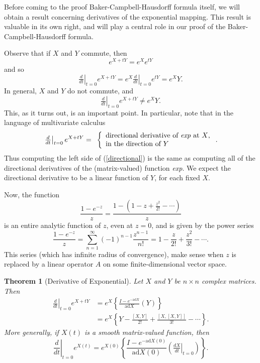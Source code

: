 \documentclass[12pt]{amsbook}
\theoremstyle{plain}
\newtheorem{theorem}{Theorem}
\numberwithin{equation}{chapter}
\numberwithin{theorem}{chapter}
\begin{document}
Before coming to the proof Baker-Campbell-Hausdorff formula itself, we will
obtain a result concerning derivatives of the exponential mapping. This result
is valuable in its own right, and will play a central role in our proof of the
Baker-Campbell-Hausdorff formula.

Observe that if $X$ and $Y$ commute, then
\[
e^{X+tY}=e^{X}e^{tY}%
\]
and so
\[
\left.  \tfrac d{dt}\right|  _{t=0}e^{X+tY}=e^{X}\left.  \tfrac d{dt}\right|
_{t=0}e^{tY}=e^{X}Y\text{.}%
\]
In general, $X$ and $Y$ do not commute, and
\[
\left.  \tfrac d{dt}\right|  _{t=0}e^{X+tY}\neq e^{X}Y\text{.}%
\]
This, as it turns out, is an important point. In particular, note that in the
language of multivariate calculus
\begin{equation}
\left.  \tfrac d{dt}\right|  _{t=0}e^{X+tY}=\text{ }\left\{
\begin{array}
[c]{l}%
\text{directional derivative of \textit{exp} at }X\text{,}\\
\text{in the direction of }Y
\end{array}
\right.  \text{.}\label{directional}%
\end{equation}
Thus computing the left side of (\ref{directional}) is the same as computing
all of the directional derivatives of the (matrix-valued) function
\textit{exp}. We expect the directional derivative to be a linear function of
$Y$, for each fixed $X$.

Now, the function
\[
\frac{1-e^{-z}}{z}=\frac{1-(1-z+\frac{z^{2}}{2!}-\cdots)}{z}%
\]
is an entire analytic function of $z$, even at $z=0$, and is given by the
power series
\[
\frac{1-e^{-z}}{z}=\sum_{n=1}^{\infty}(-1)^{n-1}\frac{z^{n-1}}{n!}=1-\frac
{z}{2!}+\frac{z^{2}}{3!}-\cdots\text{.}%
\]
This series (which has infinite radius of convergence), make sense when $z$ is
replaced by a linear operator $A$ on some finite-dimensional vector space.

\begin{theorem}
[Derivative of Exponential]\label{exp.derivative}Let $X$ and $Y$ be $n\times
n$ complex matrices. Then
\begin{align}
\left.  \frac{d}{dt}\right|  _{t=0}e^{X+tY}  & =e^{X}\left\{  \frac
{I-e^{-\mathrm{ad}X}}{\mathrm{ad}X}(Y)\right\}  \nonumber\\
& =e^{X}\left\{  Y-\frac{[X,Y]}{2!}+\frac{[X,[X,Y]]}{3!}-\cdots\right\}
\text{.}\label{derivative.a}%
\end{align}
More generally, if $X\left(  t\right)  $ is a smooth matrix-valued function,
then
\begin{equation}
\left.  \frac{d}{dt}\right|  _{t=0}e^{X(t)}=e^{X(0)}\left\{  \frac
{I-e^{-\mathrm{ad}X(0)}}{\mathrm{ad}X(0)}\left(  \left.  \tfrac{dX}%
{dt}\right|  _{t=0}\right)  \right\}  \text{.}\label{derivative2}%
\end{equation}
\end{theorem}
\end{document}
